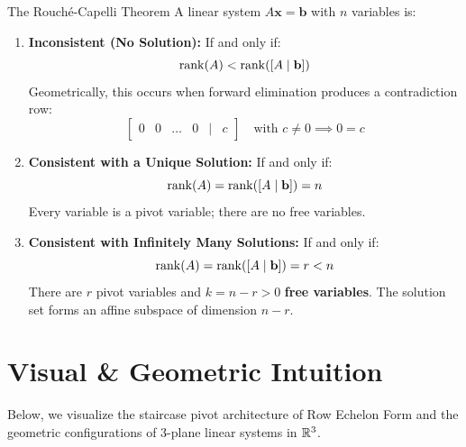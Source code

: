 \begin{theorembox}{The Rouché-Capelli Theorem}
A linear system $A\mathbf{x} = \mathbf{b}$ with $n$ variables is:
\begin{enumerate}
    \item \textbf{Inconsistent (No Solution):} If and only if:
    \begin{equation}
    \operatorname{rank}(A) < \operatorname{rank}([A \mid \mathbf{b}])
    \end{equation}
    Geometrically, this occurs when forward elimination produces a contradiction row:
    \begin{equation}
    \begin{bmatrix} 0 & 0 & \dots & 0 & \mid & c \end{bmatrix} \quad \text{with } c \neq 0 \implies 0 = c
    \end{equation}
    \item \textbf{Consistent with a Unique Solution:} If and only if:
    \begin{equation}
    \operatorname{rank}(A) = \operatorname{rank}([A \mid \mathbf{b}]) = n
    \end{equation}
    Every variable is a pivot variable; there are no free variables.
    \item \textbf{Consistent with Infinitely Many Solutions:} If and only if:
    \begin{equation}
    \operatorname{rank}(A) = \operatorname{rank}([A \mid \mathbf{b}]) = r < n
    \end{equation}
    There are $r$ pivot variables and $k = n - r > 0$ \textbf{free variables}. The solution set forms an affine subspace of dimension $n - r$.
\end{enumerate}
\end{theorembox}

\section{Visual \& Geometric Intuition}

Below, we visualize the staircase pivot architecture of Row Echelon Form and the geometric configurations of 3-plane linear systems in $\mathbb{R}^3$.

